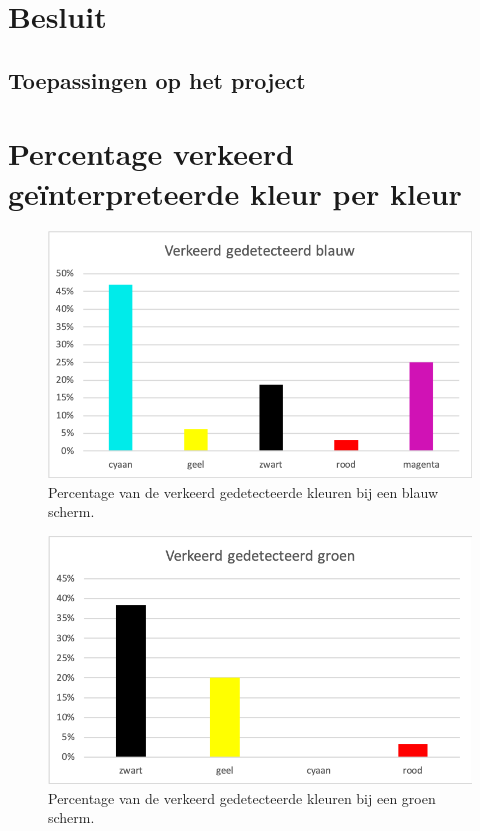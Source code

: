 \documentclass[a4paper,11pt]{article}
\begin{document}
\section{Besluit}\label{sec:besluit}
	
	
	\subsection{Toepassingen op het project}\label{subsec:toepassingen}
		

\newpage
\appendix 
\section{Percentage verkeerd geïnterpreteerde kleur per kleur}	
\bigskip	
		\begin{figure} [H]
			\center
			\includegraphics{img/WrongBlue}
			\caption{Percentage van de verkeerd gedetecteerde kleuren bij een blauw scherm.}
		\end{figure}
	\bigskip		
		\begin{figure} [H]
			\center
			\includegraphics{img/WrongGreen}
			\caption{Percentage van de verkeerd gedetecteerde kleuren bij een groen scherm.}
		\end{figure}
\end{document}
